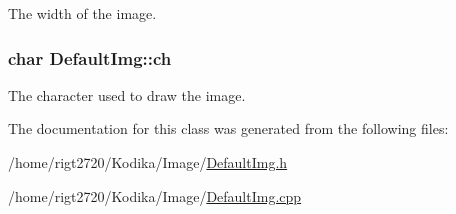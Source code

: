 The width of the image. 

\hypertarget{classDefaultImg_ac77e80e5517c44a6c6a7f7d50fe30bbc}{
\subsubsection[{ch}]{\setlength{\rightskip}{0pt plus 5cm}char Default\-Img\-::ch\hspace{0.3cm}{\ttfamily [private]}}}\label{classDefaultImg_ac77e80e5517c44a6c6a7f7d50fe30bbc}


The character used to draw the image. 



The documentation for this class was generated from the following files\-:\begin{DoxyCompactItemize}
\item 
/home/rigt2720/\-Kodika/\-Image/\hyperlink{DefaultImg_8h}{Default\-Img.\-h}\item 
/home/rigt2720/\-Kodika/\-Image/\hyperlink{DefaultImg_8cpp}{Default\-Img.\-cpp}\end{DoxyCompactItemize}
